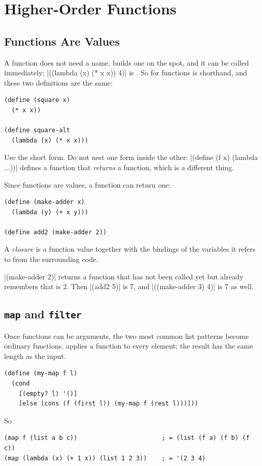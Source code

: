 \section{Higher-Order Functions}
\label{sec:hof}

\subsection{Functions Are Values}

A function does not need a name.  builds one on the spot, and it can be called immediately: \rkt|((lambda (x) (* x x)) 4)| is . So  for functions is shorthand, and these two definitions are the same:
\begin{lstlisting}
(define (square x)
  (* x x))

(define square-alt
  (lambda (x) (* x x)))
\end{lstlisting}
Use the short form. Do not nest one form inside the other: \rkt|(define (f x) (lambda ...))| defines a function that \emph{returns} a function, which is a different thing.

Since functions are values, a function can return one:
\begin{lstlisting}
(define (make-adder x)
  (lambda (y) (+ x y)))

(define add2 (make-adder 2))
\end{lstlisting}

\begin{definition}[Closure]
A \emph{closure} is a function value together with the bindings of the variables it refers to from the surrounding code.
\end{definition}

\rkt|(make-adder 2)| returns a function that has not been called yet but already remembers that  is 2. Then \rkt|(add2 5)| is 7, and \rkt|((make-adder 3) 4)| is 7 as well.

\subsection{\texttt{map} and \texttt{filter}}

Once functions can be arguments, the two most common list patterns become ordinary functions.  applies a function to every element; the result has the same length as the input.
\begin{lstlisting}
(define (my-map f l)
  (cond
    [(empty? l) '()]
    [else (cons (f (first l)) (my-map f (rest l)))]))
\end{lstlisting}
So
\begin{lstlisting}
(map f (list a b c))                       ; = (list (f a) (f b) (f c))
(map (lambda (x) (+ 1 x)) (list 1 2 3))    ; = '(2 3 4)
\end{lstlisting}


